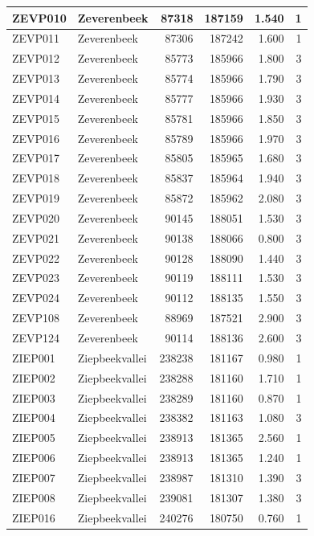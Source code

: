 \documentclass[11pt,]{book}
\begin{document}
\begin{table}
\begin{tabular}[t]{l|l|r|r|r|r}
\hline
ZEVP010 & Zeverenbeek & 87318 & 187159 & 1.540 & 1\\
\hline
ZEVP011 & Zeverenbeek & 87306 & 187242 & 1.600 & 1\\
\hline
ZEVP012 & Zeverenbeek & 85773 & 185966 & 1.800 & 3\\
\hline
ZEVP013 & Zeverenbeek & 85774 & 185966 & 1.790 & 3\\
\hline
ZEVP014 & Zeverenbeek & 85777 & 185966 & 1.930 & 3\\
\hline
ZEVP015 & Zeverenbeek & 85781 & 185966 & 1.850 & 3\\
\hline
ZEVP016 & Zeverenbeek & 85789 & 185966 & 1.970 & 3\\
\hline
ZEVP017 & Zeverenbeek & 85805 & 185965 & 1.680 & 3\\
\hline
ZEVP018 & Zeverenbeek & 85837 & 185964 & 1.940 & 3\\
\hline
ZEVP019 & Zeverenbeek & 85872 & 185962 & 2.080 & 3\\
\hline
ZEVP020 & Zeverenbeek & 90145 & 188051 & 1.530 & 3\\
\hline
ZEVP021 & Zeverenbeek & 90138 & 188066 & 0.800 & 3\\
\hline
ZEVP022 & Zeverenbeek & 90128 & 188090 & 1.440 & 3\\
\hline
ZEVP023 & Zeverenbeek & 90119 & 188111 & 1.530 & 3\\
\hline
ZEVP024 & Zeverenbeek & 90112 & 188135 & 1.550 & 3\\
\hline
ZEVP108 & Zeverenbeek & 88969 & 187521 & 2.900 & 3\\
\hline
ZEVP124 & Zeverenbeek & 90114 & 188136 & 2.600 & 3\\
\hline
ZIEP001 & Ziepbeekvallei & 238238 & 181167 & 0.980 & 1\\
\hline
ZIEP002 & Ziepbeekvallei & 238288 & 181160 & 1.710 & 1\\
\hline
ZIEP003 & Ziepbeekvallei & 238289 & 181160 & 0.870 & 1\\
\hline
ZIEP004 & Ziepbeekvallei & 238382 & 181163 & 1.080 & 3\\
\hline
ZIEP005 & Ziepbeekvallei & 238913 & 181365 & 2.560 & 1\\
\hline
ZIEP006 & Ziepbeekvallei & 238913 & 181365 & 1.240 & 1\\
\hline
ZIEP007 & Ziepbeekvallei & 238987 & 181310 & 1.390 & 3\\
\hline
ZIEP008 & Ziepbeekvallei & 239081 & 181307 & 1.380 & 3\\
\hline
ZIEP016 & Ziepbeekvallei & 240276 & 180750 & 0.760 & 1\\

\end{tabular}
\end{table}
\end{document}
